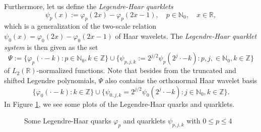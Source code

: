 \documentclass{article}
\newcommand{\ing}[1]{$\vcenter{\hbox{\texttt{[image: \#1]}}}$}
\begin{document}
Furthermore, let us define the \emph{Legendre-Haar quarklets}
\begin{equation}
  \label{eq:psip}
  \psi_p(x):=\varphi_p(2x)-\varphi_p(2x-1),\quad
  p\in\mathbb N_0,\quad x\in\mathbb R,
\end{equation}
which is a generalization of the two-scale relation $\psi_0(x)=\varphi_0(2x)-\varphi_0(2x-1)$ of Haar wavelets. The \emph{Legendre-Haar quarklet system} is then given as the set
\begin{equation}
\label{eq:Psi}
\Psi:=\big\{\varphi_p(\cdot -k):p\in\mathbb N_0,k\in\mathbb Z\big\}\cup\big\{\psi_{p,j,k}:=2^{j/2}\psi_p(2^j\cdot-k):p,j,\in\mathbb N_0,k\in\mathbb Z\big\}
\end{equation}
of $L_2(\mathbb R)$-normalized functions. Note that besides from the truncated and shifted Legendre polynomials, $\Psi$ also contains the orthonormal Haar wavelet basis
\begin{equation*}
\big\{\varphi_0(\cdot -k):k\in\mathbb Z\big\}\cup\big\{\psi_{0,j,k}=2^{j/2}\psi_0(2^j\cdot-k):j\in\mathbb N_0,k\in\mathbb Z\big\}.
\end{equation*}
In Figure \ref{fig:quarklets}, we see some plots of the Legendre-Haar quarks and quarklets.

\begin{figure}[hbt]
\centering
{}
\caption{\label{fig:quarklets} Some Legendre-Haar quarks $\varphi_p$ and quarklets $\psi_{p,j,k}$ with $0\le p\le 4$}
\end{figure}
\end{document}
